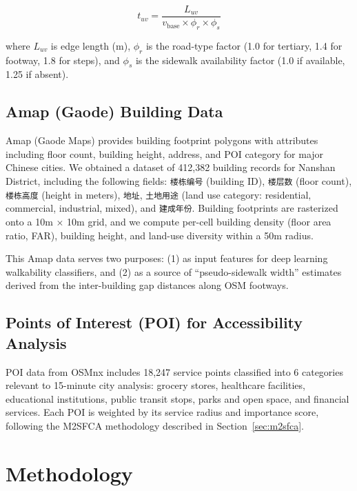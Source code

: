 \documentclass[journal]{IEEEtran}
\begin{document}
\begin{equation}
t_{uv} = \frac{L_{uv}}{v_{\text{base}} \times \phi_r \times \phi_s}
\label{eq:edge_time}
\end{equation}

where $L_{uv}$ is edge length (m), $\phi_r$ is the road-type factor (1.0 for tertiary, 1.4 for footway, 1.8 for steps), and $\phi_s$ is the sidewalk availability factor (1.0 if available, 1.25 if absent).

\subsection{Amap (Gaode) Building Data}

Amap (Gaode Maps) provides building footprint polygons with attributes including floor count, building height, address, and POI category for major Chinese cities. We obtained a dataset of 412,382 building records for Nanshan District, including the following fields: \texttt{楼栋编号} (building ID), \texttt{楼层数} (floor count), \texttt{楼栋高度} (height in meters), \texttt{地址}, \texttt{土地用途} (land use category: residential, commercial, industrial, mixed), and \texttt{建成年份}. Building footprints are rasterized onto a 10m $\times$ 10m grid, and we compute per-cell building density (floor area ratio, FAR), building height, and land-use diversity within a 50m radius.

This Amap data serves two purposes: (1) as input features for deep learning walkability classifiers, and (2) as a source of ``pseudo-sidewalk width'' estimates derived from the inter-building gap distances along OSM footways.

\subsection{Points of Interest (POI) for Accessibility Analysis}

POI data from OSMnx includes 18,247 service points classified into 6 categories relevant to 15-minute city analysis: grocery stores, healthcare facilities, educational institutions, public transit stops, parks and open space, and financial services. Each POI is weighted by its service radius and importance score, following the M2SFCA methodology described in Section~\ref{sec:m2sfca}.

\section{Methodology}
\label{sec:methodology}
\end{document}
